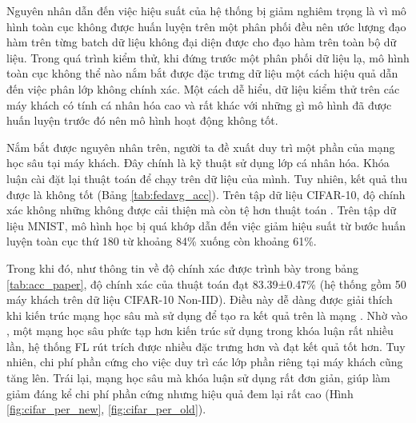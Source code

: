 Nguyên nhân dẫn đến việc hiệu suất của hệ thống bị giảm nghiêm trọng là vì mô hình toàn cục không được huấn luyện trên một phân phối đều nên ước lượng đạo hàm trên từng batch dữ liệu không đại diện được cho đạo hàm trên toàn bộ dữ liệu. Trong quá trình kiểm thử, khi đứng trước một phân phối dữ liệu lạ, mô hình toàn cục không thể nào nắm bắt được đặc trưng dữ liệu một cách hiệu quả dẫn đến việc phân lớp không chính xác. Một cách dễ hiểu, dữ liệu kiểm thử trên các máy khách có tính cá nhân hóa cao và rất khác với những gì mô hình đã được huấn luyện trước đó nên mô hình hoạt động không tốt.

Nắm bắt được nguyên nhân trên, người ta đề xuất duy trì một phần của mạng học sâu tại máy khách. Đây chính là kỹ thuật sử dụng lớp cá nhân hóa. Khóa luận cài đặt lại thuật toán  để chạy trên dữ liệu của mình. Tuy nhiên, kết quả thu được là không tốt (Bảng \ref{tab:fedavg_acc}). Trên tập dữ liệu CIFAR-10, độ chính xác không những không được cải thiện mà còn tệ hơn thuật toán . Trên tập dữ liệu MNIST, mô hình học bị quá khớp dẫn đến việc giảm hiệu suất từ bước huấn luyện toàn cục thứ 180 từ khoảng 84\% xuống còn khoảng 61\%.

Trong khi đó, như thông tin về độ chính xác được trình bày trong bảng \ref{tab:acc_paper}, độ chính xác của thuật toán  đạt 83.39±0.47\% (hệ thống gồm 50 máy khách trên dữ liệu CIFAR-10 Non-IID). Điều này dễ dàng được giải thích khi kiến trúc mạng học sâu mà  sử dụng để tạo ra kết quả trên là mạng  \cite{howard2017mobilenets}. Nhờ vào , một mạng học sâu phức tạp hơn kiến trúc sử dụng trong khóa luận rất nhiều lần, hệ thống FL rút trích được nhiều đặc trưng hơn và đạt kết quả tốt hơn. Tuy nhiên, chi phí phần cứng cho việc duy trì các lớp phần riêng tại máy khách cũng tăng lên. Trái lại, mạng học sâu mà khóa luận sử dụng rất đơn giản, giúp làm giảm đáng kể chi phí phần cứng nhưng hiệu quả đem lại rất cao (Hình \ref{fig:cifar_per_new}, \ref{fig:cifar_per_old}).

